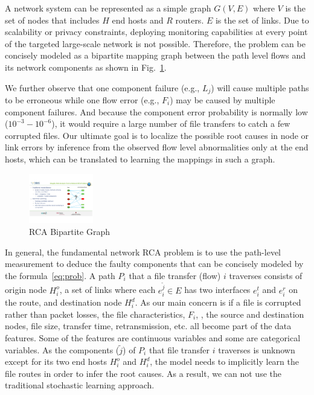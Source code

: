 A network system can be represented as a simple graph $G(V,E)$ where $V$ is the set of nodes that includes $H$ end hosts and $R$ routers. $E$ is the set of links. 
Due to scalability or privacy constraints, deploying monitoring capabilities at every point of the targeted large-scale network is not possible. Therefore, the problem can be concisely modeled as a bipartite mapping graph between the path level flows and its network components as shown in Fig.~\ref{fig:bipartite}. 

We further observe that one component failure (e.g., $L_j$) will cause multiple paths to be erroneous while one flow error (e.g., $F_i$) may be caused by multiple component failures. And because the component error probability is normally low ($10^{-3} - 10^{-6}$), it would require a large number of file transfers to catch a few corrupted files. Our ultimate goal is to localize the possible root causes in node or link errors by inference from the observed flow level abnormalities only at the end hosts, which can be translated to learning the mappings in such a graph.

\begin{figure}
  \begin{center}
    \includegraphics[width=0.25\textwidth]{./figure/RCABipartite}
  \end{center}
  \vspace{-5pt}
\caption{RCA Bipartite Graph}
\vspace{-5pt}
\label{fig:bipartite}
\end{figure}

In general, the fundamental network RCA problem is to use the path-level measurement to deduce the faulty components that can be concisely modeled by the formula~\ref{eq:prob}.
A path $P_i$ that a file transfer (flow) $i$ traverses consists of origin node $H_i^o$, a set of links where each $e_i^{\tilde{j}}\in E$ has two interfaces $e_i^t$ and $e_i^r$ on the route, and destination node $H_i^d$. 
As our main concern is if a file is corrupted rather than packet losses, the file characteristics, $F_i$, \eg, the source and destination nodes, file size, transfer time, retransmission, etc. all become part of the data features. 
Some of the features are continuous variables and some are categorical variables.
As the components ($\tilde{j}$) of $P_i$ that file transfer $i$ traverses is unknown except for its two end hosts $H_i^o$ and $H_i^d$, the model needs to implicitly learn the file routes in order to infer the root causes.   
As a result, we can not use the traditional stochastic learning approach.

